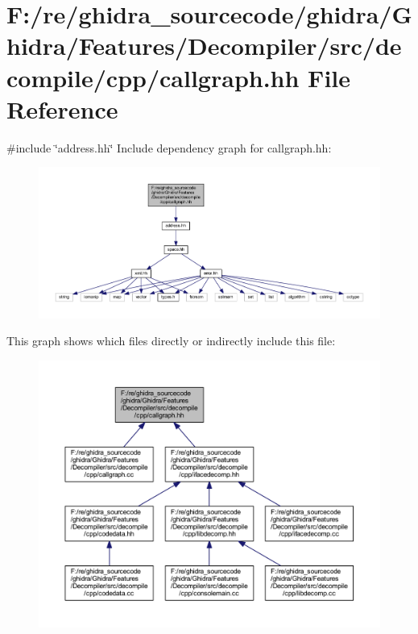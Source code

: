 \hypertarget{callgraph_8hh}{}\section{F\+:/re/ghidra\+\_\+sourcecode/ghidra/\+Ghidra/\+Features/\+Decompiler/src/decompile/cpp/callgraph.hh File Reference}
\label{callgraph_8hh}
{\ttfamily \#include \char`\"{}address.\+hh\char`\"{}}\newline
Include dependency graph for callgraph.\+hh\+:
\nopagebreak
\begin{figure}[H]
\begin{center}
\leavevmode
\includegraphics[width=350pt]{callgraph_8hh__incl}
\end{center}
\end{figure}
This graph shows which files directly or indirectly include this file\+:
\nopagebreak
\begin{figure}[H]
\begin{center}
\leavevmode
\includegraphics[width=350pt]{callgraph_8hh__dep__incl}
\end{center}
\end{figure}
